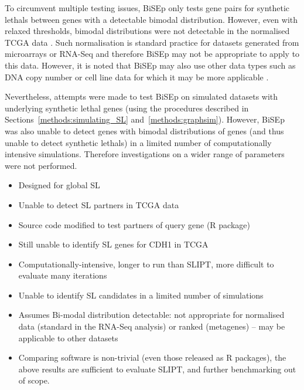 To circumvent multiple testing issues, \gls{BiSEp} only tests gene pairs for \glspl{synthetic lethal} between genes with a detectable bimodal distribution. However, even with relaxed thresholds, bimodal distributions were not detectable in the normalised \gls{TCGA} data \citep{TCGA2012}. Such normalisation \cite{limma} is standard practice for  datasets generated from \glspl{microarray} or \gls{RNA-Seq} and therefore \gls{BiSEp} may not be appropriate to apply to this data. However, it is noted that \gls{BiSEp} may also use other data types such as \acrshort{DNA} copy number or cell line data for which it may be more applicable \citep{Wappett2016}.

Nevertheless, attempts were made to test \gls{BiSEp} on simulated datasets with underlying \gls{synthetic lethal} genes (using the procedures described in Sections~\ref{methods:simulating_SL} and~\ref{methods:graphsim}). However, \gls{BiSEp} was also unable to detect genes with bimodal distributions of genes (and thus unable to detect \glspl{synthetic lethal}) in a limited number of computationally intensive simulations. Therefore investigations on a wider range of parameters were not performed.


\iffalse

\begin{itemize}
 \item Designed for global SL
 \item Unable to detect SL partners in \gls{TCGA} data
 \item Source code modified to test partners of query gene (R package)
 \item Still unable to identify SL genes for CDH1 in TCGA
 \item Computationally-intensive, longer to run than SLIPT, more difficult to evaluate many iterations
 \item Unable to identify SL candidates in a limited number of simulations
 \item Assumes Bi-modal distribution detectable: not appropriate for normalised  data (standard in the \gls{RNA-Seq} analysis) or ranked (metagenes) -- may be applicable to other datasets
 \item Comparing software is non-trivial (even those released as R packages), the above results are sufficient to evaluate \gls{SLIPT}, and further benchmarking out of scope.
\end{itemize}

